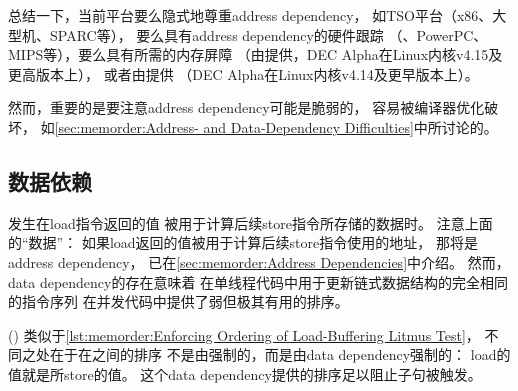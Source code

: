 {{	总结一下，当前平台要么隐式地尊重address dependency，
	如TSO平台（x86、大型机、SPARC等），
	要么具有address dependency的硬件跟踪
	（\ARM、PowerPC、MIPS等），要么具有所需的内存屏障
	（由提供，DEC Alpha在Linux内核v4.15及更高版本上），
	或者由提供
	（DEC Alpha在Linux内核v4.14及更早版本上）。
}\QuickQuizEndB
%
\QuickQuizEndM
%
\QuickQuizEndE
}

然而，重要的是要注意address dependency可能是脆弱的，
容易被编译器优化破坏，
如\cref{sec:memorder:Address- and Data-Dependency Difficulties}中所讨论的。

\subsection{数据依赖}
\label{sec:memorder:Data Dependencies}

\emph{}发生在load指令返回的值
被用于计算后续store指令所存储的数据时。
注意上面的``数据''：
如果load返回的值被用于计算后续store指令使用的地址，
那将是address dependency，
已在\cref{sec:memorder:Address Dependencies}中介绍。
然而，data dependency的存在意味着
在单线程代码中用于更新链式数据结构的完全相同的指令序列
在并发代码中提供了弱但极其有用的排序。

\begin{listing}

\caption{Load-Buffering 数据依赖石蕊测试}
\label{lst:memorder:Load-Buffering Data-Dependency Litmus Test}
\end{listing}

\begin{fcvref}
()
类似于\cref{lst:memorder:Enforcing Ordering of Load-Buffering Litmus Test}，
不同之处在于在之间的排序
不是由强制的，而是由data dependency强制的：
load的值就是所store的值。
这个data dependency提供的排序足以阻止子句被触发。
\end{fcvref}

